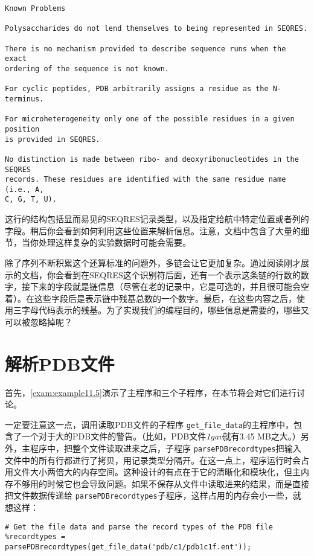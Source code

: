 \begin{lstlisting}
Known Problems 

Polysaccharides do not lend themselves to being represented in SEQRES. 

There is no mechanism provided to describe sequence runs when the exact
ordering of the sequence is not known. 

For cyclic peptides, PDB arbitrarily assigns a residue as the N-terminus. 

For microheterogeneity only one of the possible residues in a given position
is provided in SEQRES. 

No distinction is made between ribo- and deoxyribonucleotides in the SEQRES
records. These residues are identified with the same residue name (i.e., A,
C, G, T, U). 
\end{lstlisting}

这行的结构包括显而易见的SEQRES记录类型，以及指定给航中特定位置或者列的字段。稍后你会看到如何利用这些位置来解析信息。注意，文档中包含了大量的细节，当你处理这样复杂的实验数据时可能会需要。

除了序列不断积累这个还算标准的问题外，多链会让它更加复杂。通过阅读刚才展示的文档，你会看到在SEQRES这个识别符后面，还有一个表示这条链的行数的数字，接下来的字段就是链信息（尽管在老的记录中，它是可选的，并且很可能会空着）。在这些字段后是表示链中残基总数的一个数字。最后，在这些内容之后，使用三字母代码表示的残基。为了实现我们的编程目的，哪些信息是需要的，哪些又可以被忽略掉呢？

\section{解析PDB文件}
首先，\autoref{exam:example11.5}演示了主程序和三个子程序，在本节将会对它们进行讨论。



一定要注意这一点，调用读取PDB文件的子程序 \verb|get_file_data|的主程序中，包含了一个对于大的PDB文件的警告。（比如，PDB文件\textit{1gav}就有3.45
MB之大。）另外，主程序中，把整个文件读取进来之后，子程序 \verb|parsePDBrecordtypes|把输入文件中的所有行都进行了拷贝，用记录类型分隔开。在这一点上，程序运行时会占用文件大小两倍大的内存空间。这种设计的有点在于它的清晰化和模块化，但主内存不够用的时候它也会导致问题。如果不保存从文件中读取进来的结果，而是直接把文件数据传递给 \verb|parsePDBrecordtypes|子程序，这样占用的内存会小一些，就想这样：

\begin{lstlisting}
# Get the file data and parse the record types of the PDB file
%recordtypes = parsePDBrecordtypes(get_file_data('pdb/c1/pdb1c1f.ent'));
\end{lstlisting}

